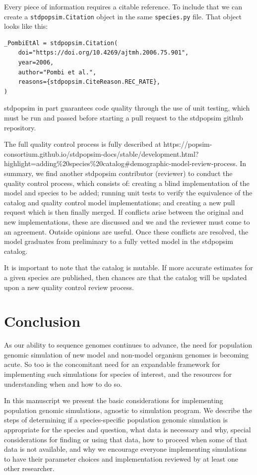 \documentclass[hidelinks]{article}
\begin{document}
Every piece of information requires a citable reference. To include that we
can create a \texttt{stdpopsim.Citation} object in the same
\texttt{species.py} file. That object looks like this:

\begin{verbatim}
_PombiEtAl = stdpopsim.Citation(
    doi="https://doi.org/10.4269/ajtmh.2006.75.901",
    year=2006,
    author="Pombi et al.",
    reasons={stdpopsim.CiteReason.REC_RATE},
)
\end{verbatim}

stdpopsim in part guarantees code quality through the use of unit
testing, which must be run and passed before starting a pull request to
the stdpopsim github repository.

The full quality control process is fully described at
https://popsim-consortium.github.io/stdpopsim-docs/stable/development.html?highlight=adding\%20species\%20catalog\#demographic-model-review-process.
In summary, we find another stdpopsim contributor (reviewer) to conduct
the quality control process, which consists of: creating a blind
implementation of the model and species to be added; running unit tests
to verify the equivalence of the catalog and quality control model
implementations; and creating a new pull request which is then finally
merged. If conflicts arise between the original and new implementations,
these are discussed and we and the reviewer must come to an agreement.
Outside opinions are useful. Once these conflicts are resolved, the
model graduates from preliminary to a fully vetted model in the stdpopsim catalog.

It is important to note that the catalog is mutable. If more accurate
estimates for a given species are published, then chances are that the
catalog will be updated upon a new quality control review process.

\hypertarget{conclusion}{%
\section*{Conclusion}\label{conclusion}}

As our ability to sequence genomes continues to advance, the need for
population genomic simulation of new model and non-model organism genomes is
becoming acute. So too is the concomitant need for an expandable framework
for implementing such simulations for species of interest, and
the resources for understanding when and how to do so.

In this manuscript we present the basic considerations for implementing
population genomic simulations, agnostic to simulation program. We
describe the steps of determining if a species-specific population
genomic simulation is appropriate for the species and question, what
data is necessary and why, special considerations for finding or using
that data, how to proceed when some of that data is not available,
and why we encourage everyone implementing simulations to have their
parameter choices and implementation reviewed by at least one other
researcher.
\end{document}
